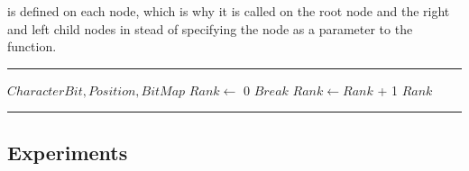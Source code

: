 \noindent {} is defined on each node, which is why it is called on the root node and the right and left child nodes in stead of specifying the node as a parameter to the  function.


\noindent\rule{\textwidth}{0.5pt}
\begin{algorithmic} 
 {$CharacterBit, Position, BitMap$}
\State $Rank \gets$ 0
		\State $Break$
	\EndIf
		\State $Rank \gets Rank$ + 1 
	\EndIf
\EndFor
\State \Return $Rank$ 
\EndFunction
\end{algorithmic}
\noindent\rule{\textwidth}{0.5pt}
\linebreak

\subsection{Experiments}